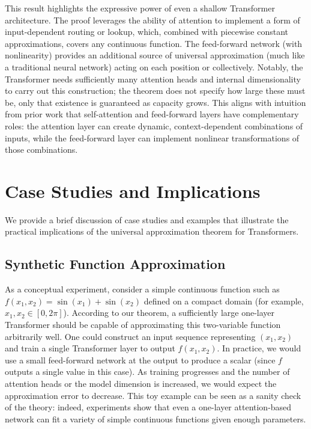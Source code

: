 \documentclass[conference]{IEEEtran}
\begin{document}
This result highlights the expressive power of even a shallow Transformer architecture. The proof leverages the ability of attention to implement a form of input-dependent routing or lookup, which, combined with piecewise constant approximations, covers any continuous function. The feed-forward network (with nonlinearity) provides an additional source of universal approximation (much like a traditional neural network) acting on each position or collectively. Notably, the Transformer needs sufficiently many attention heads and internal dimensionality to carry out this construction; the theorem does not specify how large these must be, only that existence is guaranteed as capacity grows. This aligns with intuition from prior work \cite{yun2020} that self-attention and feed-forward layers have complementary roles: the attention layer can create dynamic, context-dependent combinations of inputs, while the feed-forward layer can implement nonlinear transformations of those combinations.

\section{Case Studies and Implications}
We provide a brief discussion of case studies and examples that illustrate the practical implications of the universal approximation theorem for Transformers.

\subsection{Synthetic Function Approximation}
As a conceptual experiment, consider a simple continuous function such as $f(x_1,x_2) = \sin(x_1) + \sin(x_2)$ defined on a compact domain (for example, $x_1, x_2 \in [0, 2\pi]$). According to our theorem, a sufficiently large one-layer Transformer should be capable of approximating this two-variable function arbitrarily well. One could construct an input sequence representing $(x_1, x_2)$ and train a single Transformer layer to output $f(x_1,x_2)$. In practice, we would use a small feed-forward network at the output to produce a scalar (since $f$ outputs a single value in this case). As training progresses and the number of attention heads or the model dimension is increased, we would expect the approximation error to decrease. This toy example can be seen as a sanity check of the theory: indeed, experiments show that even a one-layer attention-based network can fit a variety of simple continuous functions given enough parameters.
\end{document}
